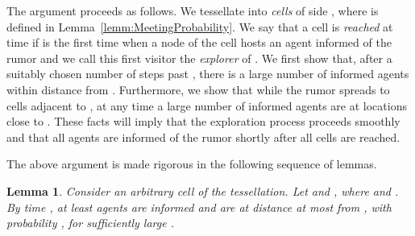 \documentclass[11pt]{article}
\newcommand{\newterm}[1]{\emph{#1}}
\newtheorem{lemm}{Lemma}
\begin{document}
	The argument proceeds as follows.
	\fi
We tessellate  into
\newterm{cells} of side ,
where  is defined in Lemma~\ref{lemm:MeetingProbability}.
We say that a cell  is
\newterm{reached} at time  if  is the first time when a node
of the cell hosts an agent informed of the rumor and we call this first
visitor the \newterm{explorer} of .
We first show that, after a suitably
chosen number  of steps past ,
there is a large number of informed agents 
within distance  from .
Furthermore, we show that while the rumor spreads to cells
adjacent to , at any time  a large number of
informed agents are at locations close to .
These facts will imply that
the exploration process proceeds smoothly and that all agents are
informed of the rumor shortly after all cells are reached.

The above argument is made rigorous in the following sequence of
lemmas.
\begin{lemm}
\label{lemm:FirstPhase}
Consider an arbitrary  cell  of the tessellation.
Let  and
,
where  and .
By time , at least  agents are informed and are
at distance at most  from ,
with probability , for sufficiently large .
\end{lemm}
\end{document}
